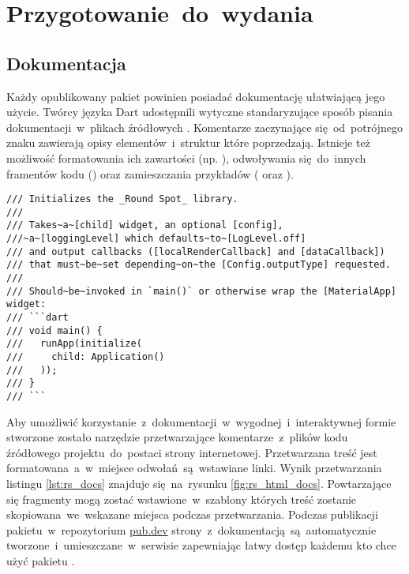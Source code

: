 \section{Przygotowanie~do~wydania}

\subsection{Dokumentacja}
Każdy opublikowany pakiet powinien posiadać dokumentację ułatwiającą jego użycie. Twórcy języka Dart udostępnili wytyczne standaryzujące sposób pisania dokumentacji~w~plikach źródłowych \cite{Dart_Doc_Guidelines}. Komentarze zaczynające się~od~potrójnego znaku \codeinline{///} zawierają opisy elementów~i~struktur które poprzedzają. Istnieje też możliwość formatowania ich zawartości (np. ), odwoływania się~do~innych framentów kodu () oraz zamieszczania przykładów ( oraz ).

\begin{lstlisting}[language=dartcomment,caption={Fragment dokumentacji zawartej~w~kodzie źródłowym pakietu},label=lst:rs_docs]
/// Initializes the _Round Spot_ library.
///
/// Takes~a~[child] widget, an optional [config],
///~a~[loggingLevel] which defaults~to~[LogLevel.off]
/// and output callbacks ([localRenderCallback] and [dataCallback]) 
/// that must~be~set depending~on~the [Config.outputType] requested.
///
/// Should~be~invoked in `main()` or otherwise wrap the [MaterialApp] widget:
/// ```dart
/// void main() {
///   runApp(initialize(
///     child: Application()
///   ));
/// }
/// ```
\end{lstlisting}

Aby umożliwić korzystanie~z~dokumentacji~w~wygodnej~i~interaktywnej formie stworzone zostało narzędzie  \cite{Dart_Doc} przetwarzające komentarze~z~plików kodu źródłowego projektu~do~postaci strony internetowej. Przetwarzana treść jest formatowana~a~w~miejsce odwołań~są~wstawiane linki. Wynik przetwarzania listingu \ref{lst:rs_docs} znajduje się~na~rysunku \ref{fig:rs_html_docs}. Powtarzające się fragmenty mogą zostać wstawione~w~szablony których treść zostanie skopiowana~we~wskazane miejsca podczas przetwarzania. Podczas publikacji pakietu~w~repozytorium \href{https://pub.dev/}{pub.dev} strony~z~dokumentacją~są~automatycznie tworzone~i~umieszczane~w~serwisie zapewniając łatwy dostęp każdemu kto chce użyć pakietu \cite{RS_Documentation}.

